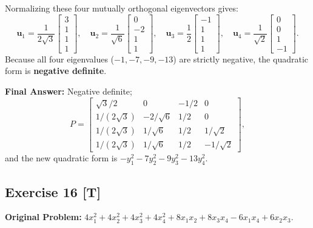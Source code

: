 \documentclass[11pt, letterpaper]{article}
\theoremstyle{definition}
\theoremstyle{remark}
\begin{document}
Normalizing these four mutually orthogonal eigenvectors gives:
\[
\mathbf{u}_1 = \frac{1}{2\sqrt{3}}\begin{bmatrix} 3 \\ 1 \\ 1 \\ 1 \end{bmatrix}, \quad
\mathbf{u}_2 = \frac{1}{\sqrt{6}}\begin{bmatrix} 0 \\ -2 \\ 1 \\ 1 \end{bmatrix}, \quad
\mathbf{u}_3 = \frac{1}{2}\begin{bmatrix} -1 \\ 1 \\ 1 \\ 1 \end{bmatrix}, \quad
\mathbf{u}_4 = \frac{1}{\sqrt{2}}\begin{bmatrix} 0 \\ 0 \\ 1 \\ -1 \end{bmatrix}.
\]
Because all four eigenvalues ($-1, -7, -9, -13$) are strictly negative, the quadratic form is \textbf{negative definite}.

\textbf{Final Answer:} Negative definite;
\[
P = \begin{bmatrix}
\sqrt{3}/2 & 0 & -1/2 & 0 \\
1/(2\sqrt{3}) & -2/\sqrt{6} & 1/2 & 0 \\
1/(2\sqrt{3}) & 1/\sqrt{6} & 1/2 & 1/\sqrt{2} \\
1/(2\sqrt{3}) & 1/\sqrt{6} & 1/2 & -1/\sqrt{2}
\end{bmatrix},
\]
and the new quadratic form is $-y_1^2 - 7y_2^2 - 9y_3^2 - 13y_4^2$.

\hrulefill

\subsection*{Exercise 16 [T]}
\textbf{Original Problem:} $4x_1^2 + 4x_2^2 + 4x_3^2 + 4x_4^2 + 8x_1x_2 + 8x_3x_4 - 6x_1x_4 + 6x_2x_3$.
\end{document}
